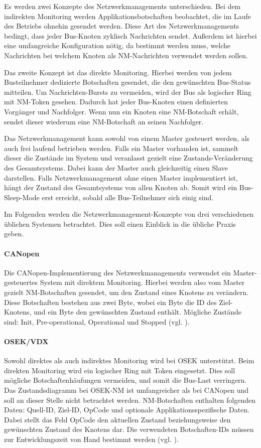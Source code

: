\documentclass[
  a4paper,					    %
  twoside,
  DIV=calc,     				%
  bibliography=totoc,
  cleardoublepage=empty,
  ngerman,     					%
  final       					%
]{scrbook}
\begin{document}
Es werden zwei Konzepte des Netzwerkmanagements unterschieden. Bei dem indirekten Monitoring werden Applikationsbotschaften beobachtet, die im Laufe des Betriebs ohnehin gesendet werden. Diese Art des Netzwerkmanagements bedingt, dass jeder Bus-Knoten zyklisch Nachrichten sendet. Außerdem ist hierbei eine umfangreiche Konfiguration nötig, da bestimmt werden muss, welche Nachrichten bei welchem Knoten als NM-Nachrichten verwendet werden sollen.

Das zweite Konzept ist das direkte Monitoring. Hierbei werden von jedem Busteilnehmer dedizierte Botschaften gesendet, die den gewünschten Bus-Sta\-tus mitteilen. Um Nachrichten-Bursts zu vermeiden, wird der Bus als logischer Ring mit NM-Token gesehen. Dadurch hat jeder Bus-Knoten einen definierten Vorgänger und Nachfolger. Wenn nun ein Knoten eine NM-Botschaft erhält, sendet dieser wiederum eine NM-Botschaft an seinen Nachfolger.

Das Netzwerkmanagement kann sowohl von einem Master gesteuert werden, als auch frei laufend betrieben werden. Falls ein Master vorhanden ist, sammelt dieser die Zustände im System und veranlasst gezielt eine Zu\-stands-Ver\-än\-de\-rung des Gesamtsystems. Dabei kann der Master auch gleichzeitig einen Slave darstellen. Falls Netzwerkmanagement ohne einen Master implementiert ist, hängt der Zustand des Gesamtsystems von allen Knoten ab. Somit wird ein Bus-Sleep-Mode erst erreicht, sobald alle Bus-Teilnehmer sich einig sind.

Im Folgenden werden die Netzwerkmanagement-Konzepte von drei verschiedenen üblichen Systemen betrachtet. Dies soll einen Einblick in die übliche Praxis geben.

\paragraph{CANopen}
Die CANopen-Implementierung des Netzwerkmanagements verwendet ein Master-gesteuertes System mit direktem Monitoring. Hierbei werden also vom Master gezielt NM-Botschaften gesendet, um den Zustand eines Knotens zu verändern. Diese Botschaften bestehen aus zwei Byte, wobei ein Byte die ID des Ziel-Knotens, und ein Byte den gewünschten Zustand enthält. Mögliche Zustände sind: Init, Pre-operational, Operational und Stopped (vgl. \cite{nm_canopen}\cite{wiki:canopen}).

\paragraph{OSEK/VDX}
Sowohl direktes als auch indirektes Monitoring wird bei OSEK unterstützt. Beim direkten Monitoring wird ein logischer Ring mit Token eingesetzt. Dies soll mögliche Botschaftenhäufungen vermeiden, und somit die Bus-Last verringern. Das Zustandsdiagramm bei OSEK-NM ist umfangreicher als bei CANopen und soll an dieser Stelle nicht betrachtet werden. NM-Botschaften enthalten folgenden Daten: Quell-ID, Ziel-ID, OpCode und optionale Applikationsspezifische Daten. Dabei stellt das Feld OpCode den aktuellen Zustand beziehungsweise den gewünschten Zustand des Knotens dar. Die verwendeten Botschaften-IDs müssen zur Entwicklungszeit von Hand bestimmt werden (vgl. \cite{nm_osek}\cite{ZimmermannSchmidgall201011}).
\end{document}
